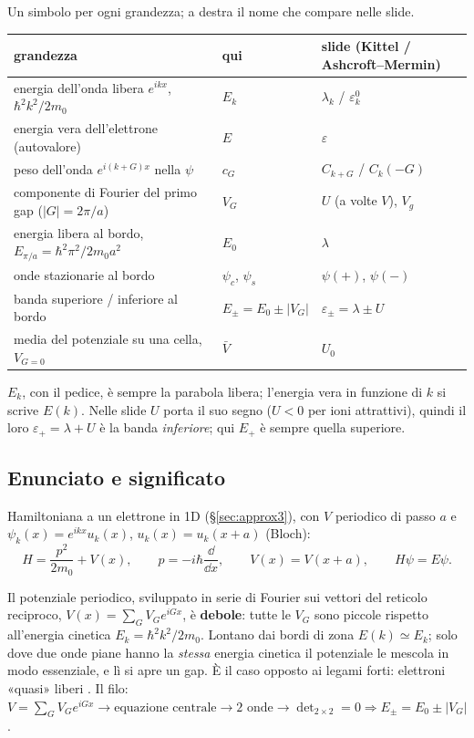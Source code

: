 \documentclass[11pt,a4paper]{article}
\begin{document}
\begin{osservazione}[notazione]
Un simbolo per ogni grandezza; a destra il nome che compare nelle slide.\par\smallskip
{\small
\begin{tabularx}{\linewidth}{@{}Xll@{}}
grandezza & qui & slide (Kittel / Ashcroft--Mermin)\\
\midrule
energia dell'onda libera $e^{ikx}$, $\hbar^2k^2/2m_0$ & $E_k$ & $\lambda_k$ / $\varepsilon^0_k$\\
energia vera dell'elettrone (autovalore) & $E$ & $\varepsilon$\\
peso dell'onda $e^{i(k+G)x}$ nella $\psi$ & $c_G$ & $C_{k+G}$ / $C_k(-G)$\\
componente di Fourier del primo gap ($|G|=2\pi/a$) & $V_G$ & $U$ (a volte $V$), $V_g$\\
energia libera al bordo, $E_{\pi/a}=\hbar^2\pi^2/2m_0a^2$ & $E_0$ & $\lambda$\\
onde stazionarie al bordo & $\psi_c$, $\psi_s$ & $\psi(+)$, $\psi(-)$\\
banda superiore / inferiore al bordo & $E_\pm=E_0\pm|V_G|$ & $\varepsilon_\pm=\lambda\pm U$\\
media del potenziale su una cella, $V_{G=0}$ & $\bar V$ & $U_0$
\end{tabularx}}

$E_k$, con il pedice, è sempre la parabola libera; l'energia vera in funzione di $k$ si scrive $E(k)$. Nelle slide $U$ porta il suo segno ($U<0$ per ioni
attrattivi), quindi il loro $\varepsilon_+=\lambda+U$ è la banda \emph{inferiore}; qui $E_+$ è sempre quella superiore.
\end{osservazione}

\subsection{Enunciato e significato}
Hamiltoniana a un elettrone in 1D (§\ref{sec:approx3}), con $V$ periodico di passo $a$ e $\psi_k(x)=e^{ikx}u_k(x)$, $u_k(x)=u_k(x+a)$ (Bloch):
\[
H=\frac{p^2}{2m_0}+V(x),\qquad p=-i\hbar\frac{\dd}{\dd x},\qquad V(x)=V(x+a),\qquad H\psi=E\psi.
\]
\begin{modello}\label{mod:qf}
Il potenziale periodico, sviluppato in serie di Fourier sui vettori del reticolo reciproco, $V(x)=\sum_GV_Ge^{iGx}$, è \textbf{debole}: tutte le $V_G$ sono
piccole rispetto all'energia cinetica $E_k=\hbar^2k^2/2m_0$.
\tcblower
Lontano dai bordi di zona $E(k)\simeq E_k$; solo dove due onde piane hanno la \emph{stessa} energia cinetica il potenziale le mescola in modo essenziale, e lì
si apre un gap. È il caso opposto ai legami forti: elettroni «quasi» liberi . Il filo:
$V=\sum_GV_Ge^{iGx}\to\text{equazione centrale}\to\text{2 onde}\to\det_{2\times2}=0\Rightarrow E_\pm=E_0\pm|V_G|$.
\end{modello}
\end{document}
